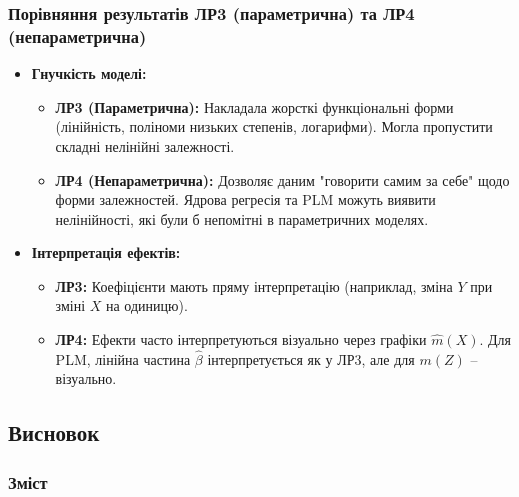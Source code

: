 ﻿\documentclass{beamer}
\begin{document}
\begin{frame}
  \frametitle{Порівняння результатів ЛР3 (параметрична) та ЛР4 (непараметрична)}
  \begin{itemize}
    \item \textbf{Гнучкість моделі:}
        \begin{itemize}
            \item \textbf{ЛР3 (Параметрична):} Накладала жорсткі функціональні форми (лінійність, поліноми низьких степенів, логарифми). Могла пропустити складні нелінійні залежності.
            \item \textbf{ЛР4 (Непараметрична):} Дозволяє даним "говорити самим за себе" щодо форми залежностей. Ядрова регресія та PLM можуть виявити нелінійності, які були б непомітні в параметричних моделях.
        \end{itemize}
    \item \textbf{Інтерпретація ефектів:}
        \begin{itemize}
            \item \textbf{ЛР3:} Коефіцієнти мають пряму інтерпретацію (наприклад, зміна $Y$ при зміні $X$ на одиницю).
            \item \textbf{ЛР4:} Ефекти часто інтерпретуються візуально через графіки $\hat{m}(X)$. Для PLM, лінійна частина $\hat{\beta}$ інтерпретується як у ЛР3, але для $m(Z)$ – візуально.
        \end{itemize}
    \end{itemize}
\end{frame}

\begin{frame}
  \section{Висновок}

  \frametitle{Зміст}
  \tableofcontents[currentsection]
\end{frame}
\end{document}
